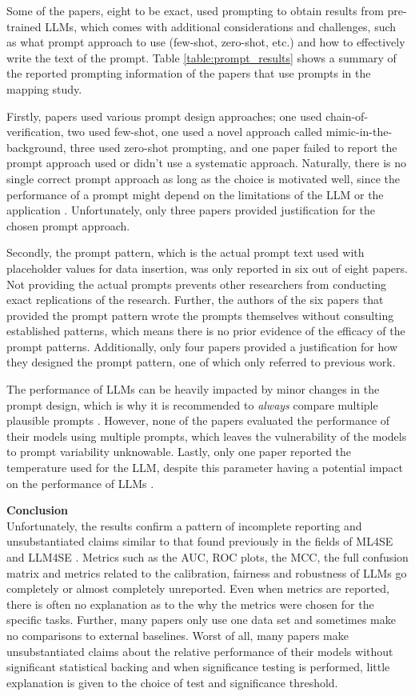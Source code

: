 \documentclass[a4paper]{article}
\begin{document}
Some of the papers, eight to be exact, used prompting to obtain results from pre-trained LLMs, which comes with additional considerations and challenges, such as what prompt approach to use (few-shot, zero-shot, etc.) and how to effectively write the text of the prompt. Table \ref{table:prompt_results} shows a summary of the reported prompting information of the papers that use prompts in the mapping study. 

Firstly, papers used various prompt design approaches; one used chain-of-verification, two used few-shot, one used a novel approach called mimic-in-the-background, three used zero-shot prompting, and one paper failed to report the prompt approach used or didn't use a systematic approach. Naturally, there is no single correct prompt approach as long as the choice is motivated well, since the performance of a prompt might depend on the limitations of the LLM or the application \cite{Marvin2024}. Unfortunately, only three papers provided justification for the chosen prompt approach. 

Secondly, the prompt pattern, which is the actual prompt text used with placeholder values for data insertion, was only reported in six out of eight papers. Not providing the actual prompts prevents other researchers from conducting exact replications of the research. Further, the authors of the six papers that provided the prompt pattern wrote the prompts themselves without consulting established patterns, which means there is no prior evidence of the efficacy of the prompt patterns. Additionally, only four papers provided a justification for how they designed the prompt pattern, one of which only referred to previous work.

The performance of LLMs can be heavily impacted by minor changes in the prompt design, which is why it is recommended to \textit{always} compare multiple plausible prompts \cite{sclar2024quantifyinglanguagemodelssensitivity}. However, none of the papers evaluated the performance of their models using multiple prompts, which leaves the vulnerability of the models to prompt variability unknowable. Lastly, only one paper reported the temperature used for the LLM, despite this parameter having a potential impact on the performance of LLMs \cite{peeperkorn2024}.

\textbf{Conclusion}\\
Unfortunately, the results confirm a pattern of incomplete reporting and unsubstantiated claims similar to that found previously in the fields of ML4SE \cite{Dellanna2022} and LLM4SE \cite{hou2024}. Metrics such as the AUC, ROC plots, the MCC, the full confusion matrix and metrics related to the calibration, fairness and robustness of LLMs go completely or almost completely unreported. Even when metrics are reported, there is often no explanation as to the why the metrics were chosen for the specific tasks. Further, many papers only use one data set and sometimes make no comparisons to external baselines. Worst of all, many papers make unsubstantiated claims about the relative performance of their models without significant statistical backing and when significance testing is performed, little explanation is given to the choice of test and significance threshold. 
\end{document}

